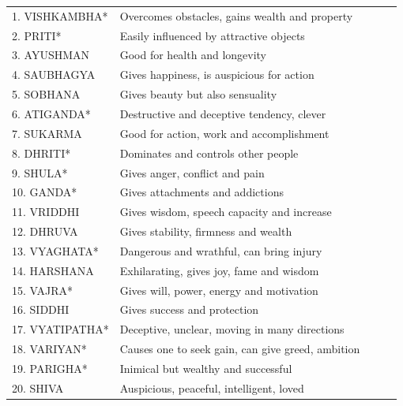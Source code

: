 \begin{enumerate}
 
\begin{center}
\begin{tabular}{ l l l}
1.    VISHKAMBHA*	&Overcomes obstacles, gains wealth and property                                \\
2.    PRITI*	&Easily influenced by attractive objects                               \\
3.    AYUSHMAN	&Good for health and longevity                               \\
4.    SAUBHAGYA	&Gives happiness, is auspicious for action                               \\
5.    SOBHANA	&Gives beauty but also sensuality                               \\
6.    ATIGANDA*	&Destructive and deceptive tendency, clever                               \\
7.    SUKARMA	&Good for action, work and accomplishment                               \\
8.    DHRITI*	&Dominates and controls other people                               \\
9.    SHULA*	&Gives anger, conflict and pain                               \\
10. GANDA*	&Gives attachments and addictions                               \\
11. VRIDDHI	&Gives wisdom, speech capacity and increase                               \\
12. DHRUVA	&Gives stability, firmness and wealth                               \\
13. VYAGHATA*	&Dangerous and wrathful, can bring injury                               \\
14. HARSHANA	&Exhilarating, gives joy, fame and wisdom                               \\
15. VAJRA*	&Gives will, power, energy and motivation                               \\
16. SIDDHI	&Gives success and protection                               \\
17. VYATIPATHA*	&Deceptive, unclear, moving in many directions                               \\
18. VARIYAN*	&Causes one to seek gain, can give greed, ambition                               \\
19. PARIGHA*	&Inimical but wealthy and successful                               \\
20. SHIVA 	&Auspicious, peaceful, intelligent, loved                               \\

\end{tabular}
\end{center}
\end{enumerate}
